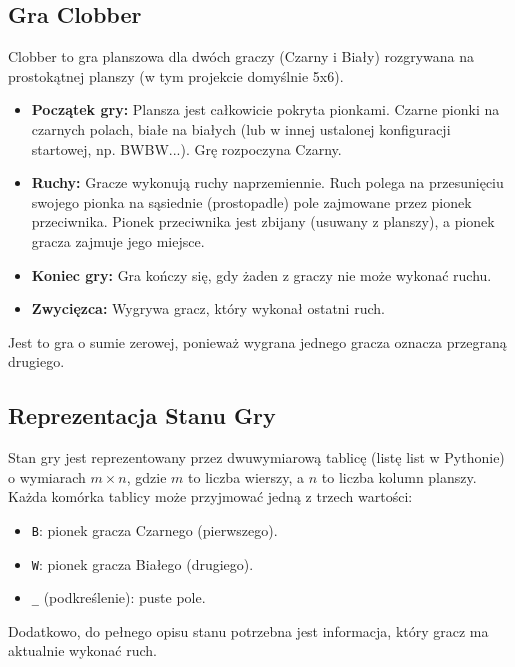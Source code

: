 \documentclass[12pt,a4paper]{article}
\newcommand{\code}[1]{\texttt{#1}} %
\begin{document}
\subsection{Gra Clobber}
Clobber to gra planszowa dla dwóch graczy (Czarny i Biały) rozgrywana na prostokątnej planszy (w tym projekcie domyślnie 5x6).
\begin{itemize}
    \item \textbf{Początek gry:} Plansza jest całkowicie pokryta pionkami. Czarne pionki na czarnych polach, białe na białych (lub w innej ustalonej konfiguracji startowej, np. BWBW...). Grę rozpoczyna Czarny.
    \item \textbf{Ruchy:} Gracze wykonują ruchy naprzemiennie. Ruch polega na przesunięciu swojego pionka na sąsiednie (prostopadle) pole zajmowane przez pionek przeciwnika. Pionek przeciwnika jest zbijany (usuwany z planszy), a pionek gracza zajmuje jego miejsce.
    \item \textbf{Koniec gry:} Gra kończy się, gdy żaden z graczy nie może wykonać ruchu.
    \item \textbf{Zwycięzca:} Wygrywa gracz, który wykonał ostatni ruch.
\end{itemize}
Jest to gra o sumie zerowej, ponieważ wygrana jednego gracza oznacza przegraną drugiego.

\subsection{Reprezentacja Stanu Gry}
Stan gry jest reprezentowany przez dwuwymiarową tablicę (listę list w Pythonie) o wymiarach $m \times n$, gdzie $m$ to liczba wierszy, a $n$ to liczba kolumn planszy. Każda komórka tablicy może przyjmować jedną z trzech wartości:
\begin{itemize}
    \item \code{B}: pionek gracza Czarnego (pierwszego).
    \item \code{W}: pionek gracza Białego (drugiego).
    \item \code{\_} (podkreślenie): puste pole. %
\end{itemize}
Dodatkowo, do pełnego opisu stanu potrzebna jest informacja, który gracz ma aktualnie wykonać ruch.
\end{document}
